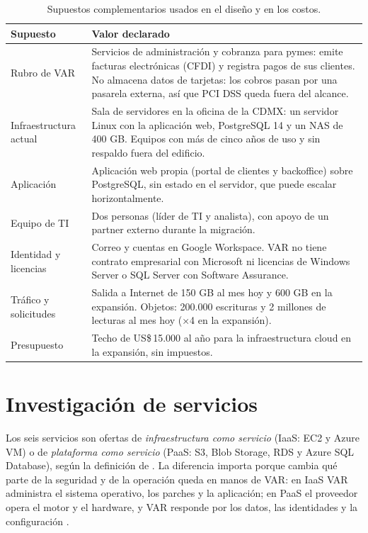 \documentclass[11pt,letterpaper]{article}
\newcommand{\usd}[1]{US\$\,#1}
\begin{document}
\begin{table}[H]
\centering\small
\caption{Supuestos complementarios usados en el diseño y en los costos.}\label{tab:supuestos2}
\begin{tabularx}{\linewidth}{L{3.4cm}Y}
\toprule
\textbf{Supuesto} & \textbf{Valor declarado}\\
\midrule
Rubro de VAR & Servicios de administración y cobranza para pymes: emite facturas electrónicas (CFDI) y registra pagos de sus clientes. No almacena datos de tarjetas: los cobros pasan por una pasarela externa, así que PCI DSS queda fuera del alcance.\\
 Infraestructura actual & Sala de servidores en la oficina de la CDMX: un servidor Linux con la aplicación web, PostgreSQL 14 y un NAS de 400 GB. Equipos con más de cinco años de uso y sin respaldo fuera del edificio.\\
Aplicación & Aplicación web propia (portal de clientes y backoffice) sobre PostgreSQL, sin estado en el servidor, que puede escalar horizontalmente.\\
 Equipo de TI & Dos personas (líder de TI y analista), con apoyo de un partner externo durante la migración.\\
Identidad y licencias & Correo y cuentas en Google Workspace. VAR no tiene contrato empresarial con Microsoft ni licencias de Windows Server o SQL Server con Software Assurance.\\
 Tráfico y solicitudes & Salida a Internet de 150 GB al mes hoy y 600 GB en la expansión. Objetos: 200.000 escrituras y 2 millones de lecturas al mes hoy (×4 en la expansión).\\
Presupuesto & Techo de \usd{15.000} al año para la infraestructura cloud en la expansión, sin impuestos.\\
\bottomrule
\end{tabularx}
\end{table}

\section{Investigación de servicios}\label{sec:investigacion}
Los seis servicios son ofertas de \emph{infraestructura como servicio} (IaaS: EC2 y Azure VM) o de \emph{plataforma como servicio} (PaaS: S3, Blob Storage, RDS y Azure SQL Database), según la definición de \textcite{nist800145}. La diferencia importa porque cambia qué parte de la seguridad y de la operación queda en manos de VAR: en IaaS VAR administra el sistema operativo, los parches y la aplicación; en PaaS el proveedor opera el motor y el hardware, y VAR responde por los datos, las identidades y la configuración \parencite{aws-shared,az-shared}.
\end{document}
